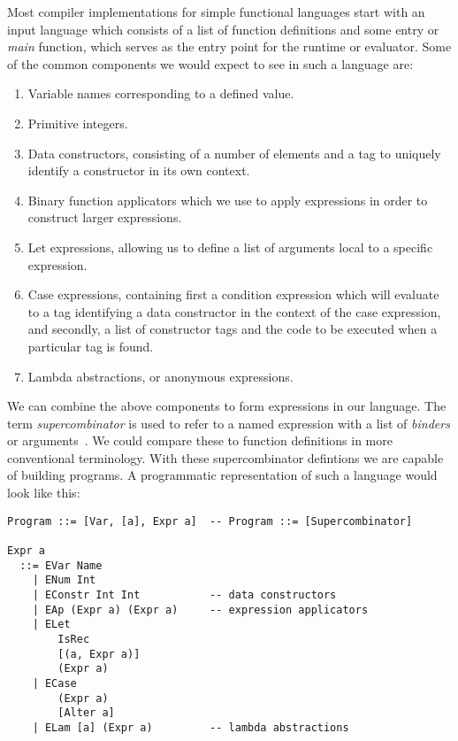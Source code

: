 Most compiler implementations for simple functional languages start with an 
input language which consists of a list of function definitions and some entry
or \emph{main} function, which serves as the entry point for the runtime or evaluator.
Some of the common components we would expect to see in such a language are:

\begin{enumerate}
	\item Variable names corresponding to a defined value.
	\item Primitive integers.
	\item Data constructors, consisting of a number of elements and a 
		  tag to uniquely identify a constructor in its own context.
	\item Binary function applicators which we use to apply expressions in order
		  to construct larger expressions.
	\item Let expressions, allowing us to define a list of arguments local
		  to a specific expression.
	\item Case expressions, containing first a condition expression which
		  will evaluate to a tag identifying a data constructor in the context
		  of the case expression, and secondly, a list of constructor tags and 
		  the code to be executed when a particular tag is found.
	\item Lambda abstractions, or anonymous expressions. 
\end{enumerate}

\noindent We can combine the above components to form expressions in our language. The
term \emph{supercombinator} is used to refer to a named expression with a 
list of \emph{binders} or arguments~\cite[pp.12]{Tutorial}. We could compare these to function 
definitions in more conventional terminology. With these supercombinator
defintions we are capable of building programs. A programmatic representation
of such a language would look like this:

\begin{verbatim}
Program ::= [Var, [a], Expr a] 	-- Program ::= [Supercombinator]

Expr a
  ::= EVar Name
    | ENum Int
    | EConstr Int Int 			-- data constructors
    | EAp (Expr a) (Expr a) 	-- expression applicators
    | ELet 
        IsRec
        [(a, Expr a)]
        (Expr a)
    | ECase
        (Expr a)
        [Alter a]
    | ELam [a] (Expr a) 		-- lambda abstractions
\end{verbatim}


